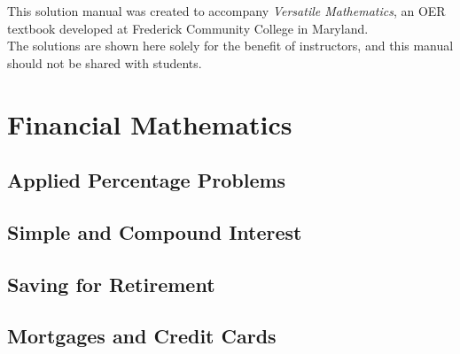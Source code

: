\documentclass[9pt,letter,twoside,openright,fleqn]{memoir}
\begin{document}
\frontmatter
{}
\pagestyle{empty}
\titleSolutionManual
\vfill

This solution manual was created to accompany \emph{Versatile Mathematics}, an OER textbook developed at Frederick Community College in Maryland.\\

The solutions are shown here solely for the benefit of instructors, and this manual should not be shared with students.
\pagebreak

%
\setcounter{tocdepth}{1}
\tableofcontents*
\mainmatter
\restoregeometry
\pagestyle{doc}

\def\answer#1{\\ \text{} \hfill \textbf{Answer to \theenumi:} $\boxed{\textrm{#1}}$}
\def\answersub#1{\\ \text{} \hfill \textbf{Answer to \theenumi\theenumii:} $\boxed{\textrm{#1}}$}

\chapter{Financial Mathematics}
\vfill
\pagebreak

\setcounter{section}{1}
\setcounter{SectionNo}{1}
\section{Applied Percentage Problems}


\section{Simple and Compound Interest}

\pagebreak

\section{Saving for Retirement}


\section{Mortgages and Credit Cards}

\pagebreak
\end{document}
